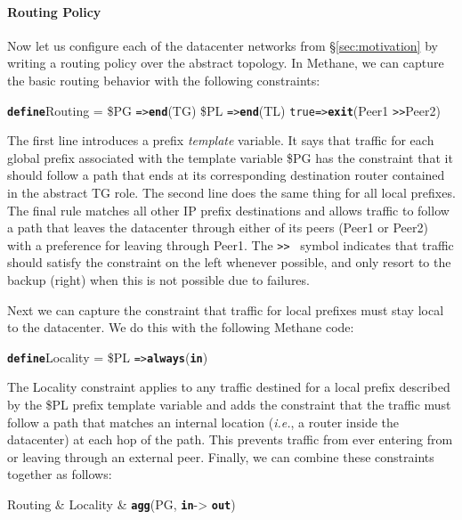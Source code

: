 \documentclass{sig-alternate-10pt}
\newcommand{\IE}{\emph{i.e.}}
\newcommand{\sysname}{{\small \sf Methane}\xspace}
\newcommand{\para}[1]{\paragraph*{\textbf{#1}}}
\newcommand{\CD}[1]{\texttt{\small #1}}  %
\newcommand{\KW}[1]{\texttt{\small\bfseries{#1}}}
\newcommand{\True}{\CD{true}}
\newcommand{\Define}{\KW{define}}
\newcommand{\Prefer}{\texttt{>>}}
\newcommand{\Path}{\texttt{=>}}
\newcommand{\Agg}{\KW{agg}}
\newcommand{\In}{\KW{in}}
\newcommand{\Out}{\KW{out}}
\newcommand{\Exit}{\KW{exit}}
\newcommand{\End}{\KW{end}}
\newcommand{\Always}{\KW{always}}
\begin{document}

\para{Routing Policy}

Now let us configure each of the datacenter networks from \S\ref{sec:motivation} by writing a routing policy over the abstract topology. In \sysname, we can capture the basic routing behavior with the following constraints:
%
\begin{code}
\Define Routing =
    \$PG  \Path \End(TG)
    \$PL  \Path \End(TL)
    \True \Path \Exit(Peer1 \Prefer Peer2)
\end{code}
\noindent%

The first line introduces a prefix \emph{template} variable. It says that traffic for each global prefix associated with the template variable \$PG has the constraint that it should follow a path that ends at its corresponding destination router contained in the abstract TG role. The second line does the same thing for all local prefixes. 
%
The final rule matches all other IP prefix destinations and allows traffic to follow a path that leaves the datacenter through either of its peers (Peer1 or Peer2) with a preference for leaving through Peer1. The \Prefer~ symbol indicates that traffic should satisfy the constraint on the left whenever possible, and only resort to the backup (right) when this is not possible due to failures.%

Next we can capture the constraint that traffic for local prefixes must stay local to the datacenter.
We do this with the following \sysname code:
%
\begin{code}
\Define Locality = 
    \$PL \Path \Always(\In)
\end{code}
\noindent%
%
The Locality constraint applies to any traffic destined for a local prefix described by the \$PL prefix template variable and adds the constraint that the traffic must follow a path that matches an internal location (\IE, a router inside the datacenter) at each hop of the path. This prevents traffic from ever entering from or leaving through an external peer. Finally, we can combine these constraints together as follows:

\begin{code}
Routing & Locality & \Agg(PG, \In -> \Out)
\end{code}
\noindent%
\end{document}
